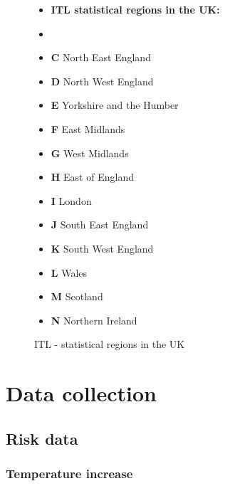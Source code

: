 \documentclass[10pt,a4]{article}
\begin{document}
\begin{figure}[h]
  \centering
  \begin{minipage}{.5\textwidth}
      \centering
      \resizebox{0.8\textwidth}{!}{}
      \caption{ITL - statistical regions in the UK}
      \label{dg:ITL Uk}
  \end{minipage}%
  \begin{minipage}{.5\textwidth}
    \vspace{-2cm}
    \begin{itemize}
            \item[] \hspace{-.5cm}\textbf{ITL statistical regions in the UK:}
            \item[]
            \item \textbf{C} North East England
            \item \textbf{D} North West England
            \item \textbf{E} Yorkshire and the Humber
            \item \textbf{F} East Midlands
            \item \textbf{G} West Midlands
            \item \textbf{H} East of England
            \item \textbf{I} London
            \item \textbf{J} South East England
            \item \textbf{K} South West England
            \item \textbf{L} Wales
            \item \textbf{M} Scotland
            \item \textbf{N} Northern Ireland
        \end{itemize}
    \end{minipage}
\end{figure}

\section{Data collection}

\subsection{Risk data}
\subsubsection{Temperature increase}
\end{document}
